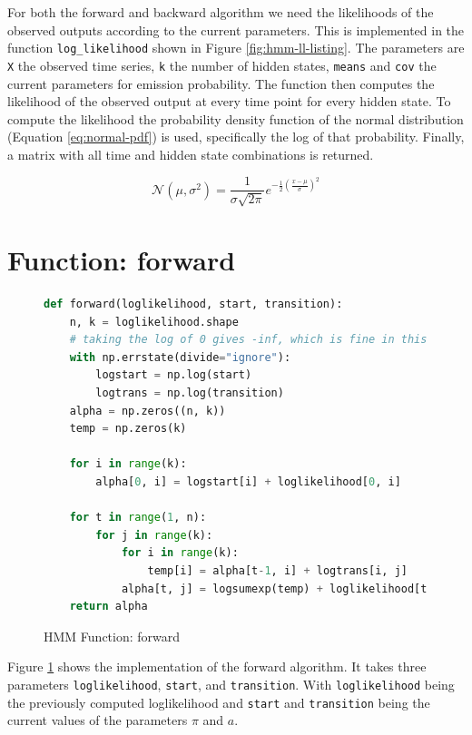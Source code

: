 For both the forward and backward algorithm we need the likelihoods of the observed outputs according to the current parameters. This is implemented in the function \texttt{log\_likelihood} shown in Figure \ref{fig:hmm-ll-listing}. The parameters are \texttt{X} the observed time series, \texttt{k} the number of hidden states, \texttt{means} and \texttt{cov} the current parameters for emission probability. The function then computes the likelihood of the observed output at every time point for every hidden state. To compute the likelihood the probability density function of the normal distribution (Equation \eqref{eq:normal-pdf}) is used, specifically the log of that probability. Finally, a matrix with all time and hidden state combinations is returned. 

\begin{equation}
  \mathcal{N}\left(\mu, \sigma^{2}\right) = \frac{1}{\sigma \sqrt{2 \pi}} e^{-\frac{1}{2}\left(\frac{x-\mu}{\sigma}\right)^{2}} 
  \label{eq:normal-pdf}
\end{equation}

\section{Function: forward}

\begin{figure}
\begin{singlespace}
\begin{lstlisting}[language=Python]
def forward(loglikelihood, start, transition):
    n, k = loglikelihood.shape
    # taking the log of 0 gives -inf, which is fine in this case
    with np.errstate(divide="ignore"):
        logstart = np.log(start)
        logtrans = np.log(transition)
    alpha = np.zeros((n, k))
    temp = np.zeros(k)

    for i in range(k):
        alpha[0, i] = logstart[i] + loglikelihood[0, i]

    for t in range(1, n):
        for j in range(k):
            for i in range(k):
                temp[i] = alpha[t-1, i] + logtrans[i, j]
            alpha[t, j] = logsumexp(temp) + loglikelihood[t, j]
    return alpha
\end{lstlisting}
\end{singlespace}
   
\caption{HMM Function: forward}    
\label{fig:hmm-forward-listing}
\end{figure}

Figure \ref{fig:hmm-forward-listing} shows the implementation of the forward algorithm. It takes three parameters \texttt{loglikelihood}, \texttt{start}, and \texttt{transition}. With \texttt{loglikelihood} being the previously computed loglikelihood and \texttt{start} and \texttt{transition} being the current values of the parameters $\pi$  and $a$.

